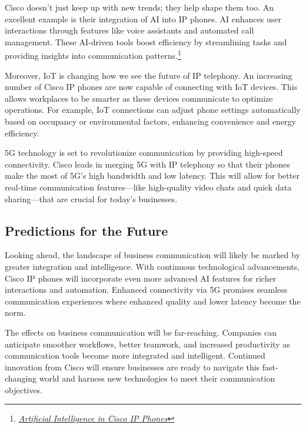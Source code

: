 \documentclass[11pt,a4paper]{article}
\begin{document}
Cisco doesn’t just keep up with new trends; they help shape them too. An excellent example is their integration of AI into IP phones. AI enhances user interactions through features like voice assistants and automated call management. These AI-driven tools boost efficiency by streamlining tasks and providing insights into communication patterns.\footnote{\href{https://www.cisco.com/c/en/us/products/collaboration-endpoints/ip-phones/index.html}{\textit{Artificial Intelligence in Cisco IP Phones}}}


Moreover, IoT is changing how we see the future of IP telephony. An increasing number of Cisco IP phones are now capable of connecting with IoT devices. This allows workplaces to be smarter as these devices communicate to optimize operations. For example, IoT connections can adjust phone settings automatically based on occupancy or environmental factors, enhancing convenience and energy efficiency.

5G technology is set to revolutionize communication by providing high-speed connectivity. Cisco leads in merging 5G with IP telephony so that their phones make the most of 5G's high bandwidth and low latency. This will allow for better real-time communication features—like high-quality video chats and quick data sharing—that are crucial for today’s businesses.

\subsection*{Predictions for the Future}

Looking ahead, the landscape of business communication will likely be marked by greater integration and intelligence. With continuous technological advancements, Cisco IP phones will incorporate even more advanced AI features for richer interactions and automation. Enhanced connectivity via 5G promises seamless communication experiences where enhanced quality and lower latency become the norm.

The effects on business communication will be far-reaching. Companies can anticipate smoother workflows, better teamwork, and increased productivity as communication tools become more integrated and intelligent. Continued innovation from Cisco will ensure businesses are ready to navigate this fast-changing world and harness new technologies to meet their communication objectives.
\end{document}
